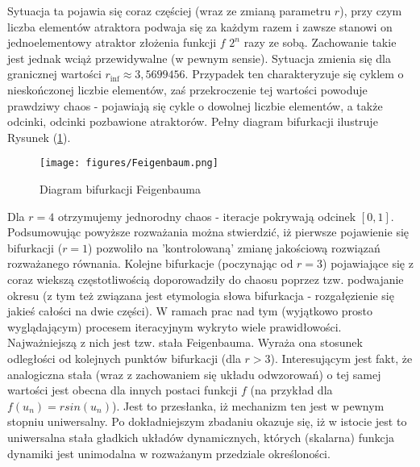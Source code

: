 \documentclass[12pt, twoside]{book}
\begin{document}
Sytuacja ta pojawia się coraz częściej (wraz ze zmianą parametru $ r $), przy czym liczba elementów atraktora podwaja się za każdym razem i zawsze stanowi on jednoelementowy atraktor złożenia funkcji $ f $ $ 2^{n} $ razy ze sobą. \newline
Zachowanie takie jest jednak wciąż przewidywalne (w pewnym sensie). Sytuacja zmienia się dla granicznej wartości \cite{Tempczyk} $ r_{\inf} \approx 3,5699456 $. Przypadek ten charakteryzuje się cyklem o nieskończonej liczbie elementów, zaś przekroczenie tej wartości powoduje prawdziwy chaos - pojawiają się cykle o dowolnej liczbie elementów, a także odcinki, odcinki pozbawione atraktorów. Pełny diagram bifurkacji ilustruje Rysunek (\ref{Fig8}).
\begin{figure}[H]
	\texttt{[image: figures/Feigenbaum.png]} 
	\centering
	\caption{Diagram bifurkacji Feigenbauma}
	\label{Fig8}
\end{figure}
Dla $ r=4 $ otrzymujemy jednorodny chaos - iteracje pokrywają odcinek $ [0,1] $.\newline
Podsumowując powyższe rozważania można stwierdzić, iż pierwsze pojawienie się bifurkacji ($ r = 1$) pozwoliło na 'kontrolowaną' zmianę jakościową rozwiązań rozważanego równania. Kolejne bifurkacje (poczynając od $ r = 3$) pojawiające się z coraz wiekszą częstotliwością doporowadziły do chaosu poprzez tzw. podwajanie okresu (z tym też związana jest etymologia słowa bifurkacja - rozgałęzienie się jakieś całości na dwie części). W ramach prac nad tym (wyjątkowo prosto wyglądającym) procesem iteracyjnym wykryto wiele prawidłowości. Najważniejszą z nich jest tzw. stała Feigenbauma. Wyraża ona stosunek odległości od kolejnych punktów bifurkacji (dla $r>3$). Interesującym jest fakt, że analogiczna stała (wraz z zachowaniem się układu odwzorowań) o tej samej wartości jest obecna dla innych postaci funkcji $f$ (na przykład dla $ f(u_{n}) = rsin(u_{n})$). Jest to przesłanka, iż mechanizm ten jest w pewnym stopniu uniwersalny. Po dokładniejszym zbadaniu okazuje się, iż w istocie jest to uniwersalna stała gładkich układów dynamicznych, których (skalarna) funkcja dynamiki jest unimodalna w rozważanym przedziale określoności.
\end{document}
